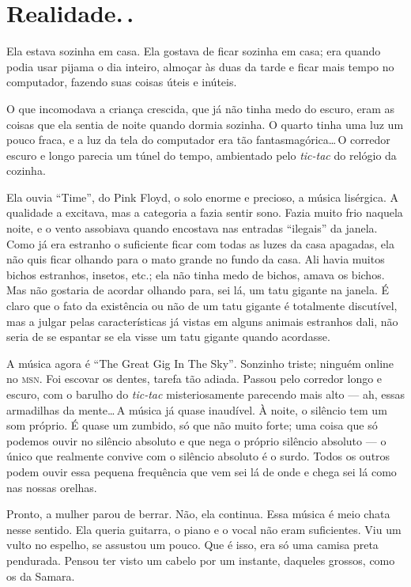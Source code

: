 \chapter{Realidade.\,.}

Ela estava sozinha em casa. Ela gostava de ficar sozinha em casa; era quando podia usar pijama o dia inteiro, almoçar às duas da tarde e ficar mais tempo no computador, fazendo suas coisas úteis e inúteis.

O que incomodava a criança crescida, que já não tinha medo do escuro, eram as coisas que ela sentia de noite quando dormia sozinha. O quarto tinha uma luz um pouco fraca, e a luz da tela do computador era tão fantasmagórica\ldots\,O corredor escuro e longo parecia um túnel do tempo, ambientado pelo \emph{tic-tac} do relógio da cozinha.

Ela ouvia ``Time'', do Pink Floyd, o solo enorme e precioso, a música lisérgica. A qualidade a excitava, mas a categoria a fazia sentir sono. Fazia muito frio naquela noite, e o vento assobiava quando encostava nas entradas ``ilegais'' da janela. Como já era estranho o suficiente ficar com todas as luzes da casa apagadas, ela não quis ficar olhando para o mato grande no fundo da casa. Ali havia muitos bichos estranhos, insetos, etc.; ela não tinha medo de bichos, amava os bichos. Mas não gostaria de acordar olhando para, sei lá, um tatu gigante na janela. É claro que o fato da existência ou não de um tatu gigante é totalmente discutível, mas a julgar pelas características já vistas em alguns animais estranhos dali, não seria de se espantar se ela visse um tatu gigante quando acordasse.

A música agora é \foreignlanguage{english}{``The Great Gig In The Sky''}. Sonzinho triste; ninguém online no \textsc{msn}. Foi escovar os dentes, tarefa tão adiada. Passou pelo corredor longo e escuro, com o barulho do \emph{tic-tac} misteriosamente parecendo mais alto --- ah, essas armadilhas da mente\ldots\,A música já quase inaudível. À noite, o silêncio tem um som próprio. É quase um zumbido, só que não muito forte; uma coisa que só podemos ouvir no silêncio absoluto e que nega o próprio silêncio absoluto --- o único que realmente convive com o silêncio absoluto é o surdo. Todos os outros podem ouvir essa pequena frequência que vem sei lá de onde e chega sei lá como nas nossas orelhas.

Pronto, a mulher parou de berrar. Não, ela continua. Essa música é meio chata nesse sentido. Ela queria guitarra, o piano e o vocal não eram suficientes. Viu um vulto no espelho, se assustou um pouco. Que é isso, era só uma camisa preta pendurada. Pensou ter visto um cabelo por um instante, daqueles grossos, como os da Samara.

